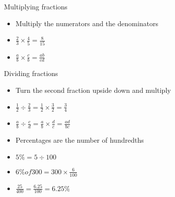 \begin{frame}
Multiplying fractions
\begin{itemize}
	\item Multiply the numerators and the denominators
	\item $\frac{2}{3} \times \frac{4}{5}  =  \frac{8}{15}$
	\item $\frac{a}{b} \times \frac{c}{b} = \frac{ab}{cd}$
\end{itemize}
Dividing fractions
\begin{itemize}
	\item Turn the second fraction upside down and multiply
	\item $\frac{1}{2} \div \frac{2}{3}  =  \frac{1}{2} \times \frac{3}{2}  =  \frac{3}{4}$
	\item $\frac{a}{b} \div \frac{c}{d}  =  \frac{a}{b} \times \frac{d}{c}  =  \frac{ad}{bc}$
\end{itemize}
\end{frame}
\begin{frame}
\begin{itemize}
	\item Percentages are the number of hundredths
	\item $ 5\% = 5 \div 100$
	\item $ 6\% of 300 = 300 \times \frac{6}{100}$
	\item $ \frac{25}{400} = \frac{6.25}{100} = 6.25\% $
\end{itemize}
\end{frame}

